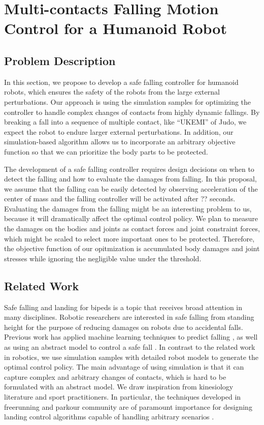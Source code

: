 \section{Multi-contacts Falling Motion Control for a Humanoid Robot}

\subsection{Problem Description}

In this section, we propose to develop a safe falling controller for 
humanoid robots, which ensures the safety of the robots from the
large external perturbations.
Our approach is using the simulation samples for optimizing the controller
to handle complex changes of contacts from highly dynamic fallings.
By breaking a fall into a sequence of multiple contact, like ``UKEMI'' of Judo,
we expect the robot to endure larger external perturbations.
In addition, our simulation-based algorithm allows us to incorporate
an arbitrary objective function so that we can prioritize the body parts
to be protected.

The development of a safe falling controller requires design decisions
on when to detect the falling and how to evaluate the damages from falling.
In this proposal, we assume that the falling can be easily detected 
by observing acceleration of the center of mass and the 
falling controller will be activated after ?? seconds.
Evaluating the damages from the falling might be an interesting problem
to us, because it will dramatically affect the optimal control policy.
We plan to measure the damages on the bodies and joints
as contact forces and joint constraint forces, which might be
scaled to select more important ones to be protected.
Therefore, the objective function of our opitmization is accumulated body
damages and joint stresses while ignoring the negligible value
under the threshold.

\subsection{Related Work}

Safe falling and landing for bipeds is a topic that
receives broad attention in many disciplines. Robotic researchers are
interested in safe falling from standing height for the purpose of
reducing damages on robots due to accidental falls. Previous work has
applied machine learning techniques to predict falling
\cite{Kalyanakrishnan:2011:LPH}, as well as using an abstract model to
control a safe fall
\cite{Fujiwara:2002:FMC,Fujiwara:2007:OPF,Yun:2009:SFH}. 
In contrast to the related work in robotics, we use simulation samples
with detailed robot models to generate the optimal control policy.
The main advantage of using simulation is that it can capture
complex and arbitrary changes of contacts, which is hard to be 
formulated with an abstract model.
We draw inspiration from kinesiology literature and sport practitioners. 
In particular, the techniques developed in freerunning and parkour 
community are of paramount importance for designing landing control 
algorithms capable of handling arbitrary scenarios
\cite{Edwardes:2009:TPF,HLJ:2011:URL}. 

